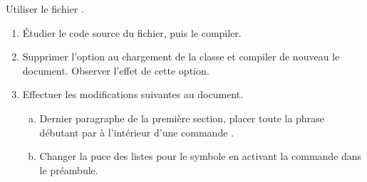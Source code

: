\begin{exercice}
  Utiliser le fichier .

  \begin{enumerate}
  \item Étudier le code source du fichier, puis le compiler.
  \item Supprimer l'option  au chargement de la classe
    et compiler de nouveau le document. Observer l'effet de cette
    option.
  \item Effectuer les modifications suivantes au document.
    \begin{enumerate}[a)]
    \item Dernier paragraphe de la première section, placer toute la
      phrase débutant par  à l'intérieur
      d'une commande .
    \item Changer la puce des listes pour le symbole \code{\$>\$} en
      activant la commande  dans
      le préambule.
    \end{enumerate}
  \end{enumerate}
\end{exercice}

